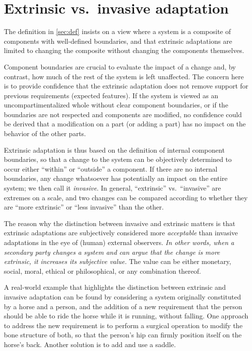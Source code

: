 \documentclass[a4paper]{article}
\newcommand{\vs}{vs.~}
\begin{document}
\section{Extrinsic \vs invasive adaptation}\label{sec:extinv}

The definition in \cref{sec:def} insists on a view where a system is a composite
of components with well-defined boundaries, and that extrinsic
adaptations are limited to changing the composite without changing the
components themselves.

Component boundaries are crucial to evaluate the impact of a change
and, by contrast, how much of the rest of the system is left
unaffected. The concern here is to provide confidence that the
extrinsic adaptation does not remove support for previous requirements
(expected features). If the system is viewed as an
uncompartimentalized whole without clear component boundaries, or if
the boundaries are not respected and components are modified, no
confidence could be derived that a modification on a part (or adding a
part) has no impact on the behavior of the other parts.

Extrinsic adaptation is thus based on the definition of internal
component boundaries, so that a change to the system can be
objectively determined to occur either ``within'' or ``outside'' a
component.  If there are no internal boundaries, any change whatsoever
has potentially an impact on the entire system; we then call it
\emph{invasive}. In general, ``extrinsic'' \vs ``invasive'' are
extremes on a scale, and two changes can be compared according to
whether they are ``more extrinsic'' or ``less invasive'' than the other.

The reason why the distinction between invasive and extrinsic matters
is that extrinsic adaptations are subjectively considered more
\emph{acceptable} than invasive adaptations in the eye of (human)
external observers. \emph{In other words, when a secondary party
  changes a system and can argue that the change is more extrinsic, it
  increases its subjective value.} The value can be either monetary,
social, moral, ethical or philosophical, or any combination thereof.

A real-world example that highlights the distinction between extrinsic
and invasive adaptation can be found by considering a system
originally constituted by a horse and a person, and the addition of a
new requirement that the person should be able to ride the horse while
it is running, without falling. One approach to address the new
requirement is to perform a surgical operation to modify the bone
structure of both, so that the person's hip can firmly position
itself on the horse's back. Another solution is to add and use a
saddle.
\end{document}
